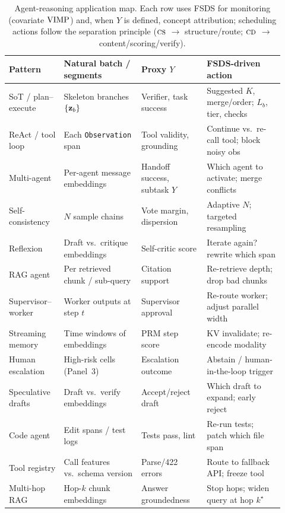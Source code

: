 \begin{table}[t]
\centering
\small
\caption{Agent-reasoning application map. Each row uses FSDS for monitoring
(covariate $\mathrm{VIMP}$) and, when $Y$ is defined, concept attribution; scheduling
actions follow the separation principle ($\textsc{cs}$ $\to$ structure/route;
$\textsc{cd}$ $\to$ content/scoring/verify).}
\label{tab:agent-apps}
\begin{tabular}{@{}p{0.18\linewidth}p{0.26\linewidth}p{0.22\linewidth}p{0.26\linewidth}@{}}
\toprule
Pattern & Natural batch / segments & Proxy $Y$ & FSDS-driven action \\
\midrule
SoT / plan--execute &
Skeleton branches $\{\mathbf{z}_b\}$ &
Verifier, task success &
Suggested $K$, merge/order; $L_b$, tier, checks \\
ReAct / tool loop &
Each \texttt{Observation} span &
Tool validity, grounding &
Continue vs.\ re-call tool; block noisy obs \\
Multi-agent &
Per-agent message embeddings &
Handoff success, subtask $Y$ &
Which agent to activate; merge conflicts \\
Self-consistency &
$N$ sample chains &
Vote margin, dispersion &
Adaptive $N$; targeted resampling \\
Reflexion &
Draft vs.\ critique embeddings &
Self-critic score &
Iterate again? rewrite which span \\
RAG agent &
Per retrieved chunk / sub-query &
Citation support &
Re-retrieve depth; drop bad chunks \\
Supervisor--worker &
Worker outputs at step $t$ &
Supervisor approval &
Re-route worker; adjust parallel width \\
Streaming memory &
Time windows of embeddings &
PRM step score &
KV invalidate; re-encode modality \\
Human escalation &
High-risk cells (Panel~3) &
Escalation outcome &
Abstain / human-in-the-loop trigger \\
Speculative drafts &
Draft vs.\ verify embeddings &
Accept/reject draft &
Which draft to expand; early reject \\
Code agent &
Edit spans / test logs &
Tests pass, lint &
Re-run tests; patch which file span \\
Tool registry &
Call features vs.\ schema version &
Parse/422 errors &
Route to fallback API; freeze tool \\
Multi-hop RAG &
Hop-$k$ chunk embeddings &
Answer groundedness &
Stop hops; widen query at hop $k^\star$ \\
\bottomrule
\end{tabular}
\end{table}

